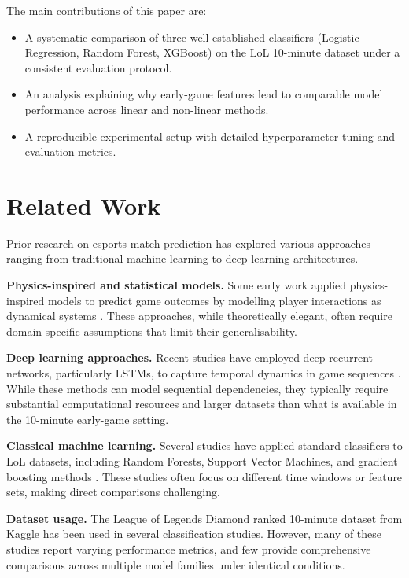 \documentclass[runningheads]{llncs}
\begin{document}
The main contributions of this paper are:
\begin{itemize}
\item A systematic comparison of three well-established classifiers (Logistic Regression, Random Forest, XGBoost) on the LoL 10-minute dataset under a consistent evaluation protocol.
\item An analysis explaining why early-game features lead to comparable model performance across linear and non-linear methods.
\item A reproducible experimental setup with detailed hyperparameter tuning and evaluation metrics.
\end{itemize}

\section{Related Work}
Prior research on esports match prediction has explored various approaches ranging from traditional machine learning to deep learning architectures.

\textbf{Physics-inspired and statistical models.} Some early work applied physics-inspired models to predict game outcomes by modelling player interactions as dynamical systems \cite{yang2015using}. These approaches, while theoretically elegant, often require domain-specific assumptions that limit their generalisability.

\textbf{Deep learning approaches.} Recent studies have employed deep recurrent networks, particularly LSTMs, to capture temporal dynamics in game sequences \cite{shao2019predicting, choi2019performance}. While these methods can model sequential dependencies, they typically require substantial computational resources and larger datasets than what is available in the 10-minute early-game setting.

\textbf{Classical machine learning.} Several studies have applied standard classifiers to LoL datasets, including Random Forests, Support Vector Machines, and gradient boosting methods \cite{khazaei2017predicting, yang2017predicting}. These studies often focus on different time windows or feature sets, making direct comparisons challenging.

\textbf{Dataset usage.} The League of Legends Diamond ranked 10-minute dataset from Kaggle has been used in several classification studies. However, many of these studies report varying performance metrics, and few provide comprehensive comparisons across multiple model families under identical conditions.
\end{document}
